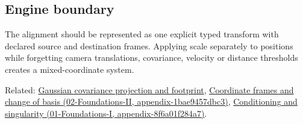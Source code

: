 \subsection{Engine boundary}\label{engine-boundary}

The alignment should be represented as one explicit typed transform with declared source and destination frames. Applying scale separately to positions while forgetting camera translations, covariance, velocity or distance thresholds creates a mixed-coordinate system.

Related: \hyperref[appendix-24269cb6977c]{Gaussian covariance projection and footprint}, \href{}{Coordinate frames and change of basis (02-Foundations-II, appendix-1bae9457dbc3)}, \href{}{Conditioning and singularity (01-Foundations-I, appendix-8f6a01f284a7)}.
